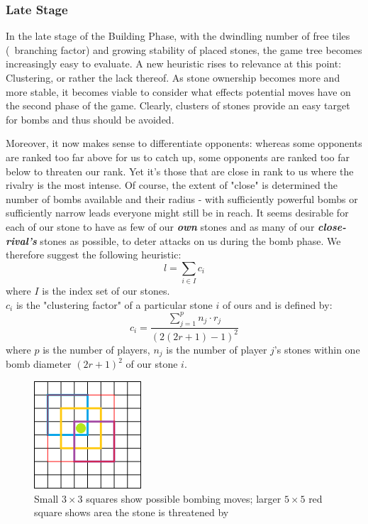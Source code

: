 \documentclass[a4paper,12pt]{article}
\begin{document}
\subsubsection{Late Stage}
In the late stage of the Building Phase, with the dwindling number of free tiles (~branching factor) and growing stability of placed stones, the game tree becomes increasingly easy to evaluate. A new heuristic rises to relevance at this point: Clustering, or rather the lack thereof. As stone ownership becomes more and more stable, it becomes viable to consider what effects potential moves have on the second phase of the game. Clearly, clusters of stones provide an easy target for bombs and thus should be avoided. 

Moreover, it now makes sense to differentiate opponents: whereas some opponents are ranked too far above for us to catch up, some opponents are ranked too far below to threaten our rank. Yet it's those that are close in rank to us where the rivalry is the most intense. Of course, the extent of "close" is determined the number of bombs available and their radius - with sufficiently powerful bombs or sufficiently narrow leads everyone might still be in reach. It seems desirable for each of our stone to have as few of our \textbf{\textit{own}} stones and as many of our \textbf{\textit{close-rival's}} stones as possible, to deter attacks on us during the bomb phase. We therefore suggest the following heuristic: \\
\[ l = \sum\limits_{i \in I} c_i \]
where $I$ is the index set of our stones. 
\\
$c_i$ is the "clustering factor" of a particular stone $i$ of ours and is defined by: \\
\[c_i = \frac{\sum\limits_{j=1}^p n_j \cdot r_j}{(2(2r+1)-1)^2}\]
where $p$ is the number of players, $n_j$ is the number of player $j$'s stones within one bomb diameter $(2r+1)^2$ of our stone $i$. \\


\begin{figure}[H]
    \centering
    \includegraphics[height=4cm]{pictures/assignment1/Bombing.png}
    \caption{Small $3 \times 3$ squares show possible bombing moves; larger $5 \times 5$ red square shows area the stone is threatened by}
    \label{fig:Bombing Diameter}
\end{figure}
\end{document}
